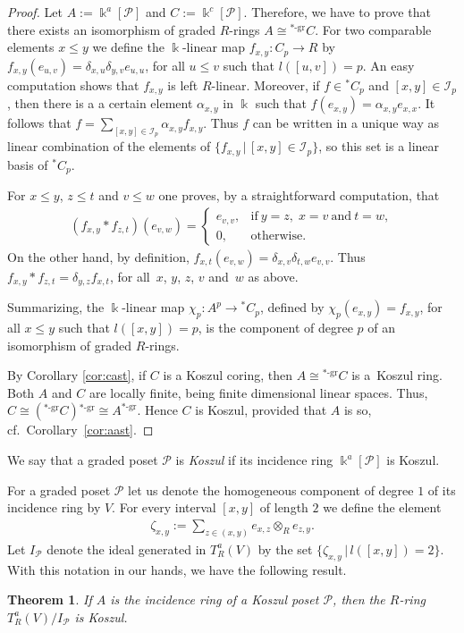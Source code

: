 \documentclass[pdftex]{sigma}
\newcommand\ot{\otimes}
\newcommand\kal{\mathscr}
\renewcommand{\^}[1]{\mbox{$^{\left( #1 \right)}$}}
\renewcommand{\_}[1]{\mbox{$_{\left( #1 \right)}$}}
\newcommand{\al}{\alpha}
\newcommand{\de}{\delta}
\numberwithin{equation}{section}
\newtheorem{Theorem}{Theorem}[section]
\begin{document}
\begin{proof}
Let $A:=\Bbbk^a[\kal{P}]$ and $C:=\Bbbk^c[\kal{P}]$. Therefore, we have to prove that there exists an isomorphism of graded $R$-rings $A\cong {^{*\text{-gr}}}C$. For two comparable elements $x\leq y$ we def\/ine the $\Bbbk$-linear map $f_{x,y}\colon C_p\to R$ by $f_{x,y}(e_{u,v})=\de_{x,u}\de_{y,v}e_{u,u}$, for all $u\leq v$ such that $l([u,v])=p$. An easy computation shows that $f_{x,y}$ is left $R$-linear. Moreover, if $f\in {^*}C_p$ and $[x,y]\in\kal{I}_p$, then there is a a certain element $\al_{x,y}$ in $\Bbbk$ such that $f(e_{x,y})=\al_{x,y}e_{x,x}$. It follows that $f=\sum\limits_{[x,y]\in\kal{I}_p}\al_{x,y}f_{x,y}$. Thus $f$ can be written in a unique way as linear combination of the elements of $\{f_{x,y}\,|\, {[x,y]\in\kal{I}_p}\}$, so this set is a linear basis of ${^*}C_p$.

For $x\leq y$, $z\leq t$ and $v\leq w$ one proves, by a straightforward computation, that
\begin{gather*}
 (f_{x,y}\ast f_{z,t})(e_{v,w})= \begin{cases}
 e_{v,v}, &\text{if} \ y=z,\; x=v \ \text{and} \ t=w,\\
 0,&\text{otherwise}.
 \end{cases}
\end{gather*}
On the other hand, by def\/inition, $f_{x,t}(e_{v,w})=\de_{x,v}\de_{t,w}e_{v,v}$. Thus $f_{x,y}\ast f_{z,t}=\de_{y,z}f_{x,t}$, for all~$x$, $y$, $z$, $v$ and~$w$ as above.

Summarizing, the $\Bbbk$-linear map $\chi_p\colon A^p \to {}^*C_p$, def\/ined by $\chi_p(e_{x,y})=f_{x,y}$, for all $x\leq y$ such that $l([x,y])=p$, is the component of degree $p$ of an isomorphism of graded $R$-rings.

By Corollary \ref{cor:cast}, if $C$ is a Koszul coring, then $A\cong {}^{*\text{-gr}}C$ is a~Koszul ring. Both $A$ and $C$ are locally f\/inite, being f\/inite dimensional linear spaces. Thus, $C\cong {}(^{*\text{-gr}}C){}^{*\text{-gr}}\cong A^{*\text{-gr}}$. Hence $C$ is Koszul, provided that $A$ is so, cf.\ Corollary~\ref{cor:aast}.
\end{proof}
\begin{Definition}
 We say that a graded poset $\kal{P}$ is \textit{Koszul} if its incidence ring $\Bbbk^a[\kal{P} ]$ is Koszul.
\end{Definition}

For a graded poset $\kal{P}$ let us denote the homogeneous component of degree $1$ of its incidence ring by $V$. For every interval $[x,y]$ of length $2$ we def\/ine the element
\begin{gather*}
\zeta_{x,y}:=\sum_{z\in (x,y)}e_{x,z}\ot_R e_{z,y}.
\end{gather*}
Let $I_\kal{P}$ denote the ideal generated in $T^a_R(V)$ by the set $\{\zeta_{x,y}\,|\, l([x,y])=2 \}$. With this notation in our hands, we have the following result.
\begin{Theorem}\label{te:shrieck}
If $A$ is the incidence ring of a Koszul poset $\kal{P}$, then the $R$-ring $T_R^a(V)/I_\kal{P}$ is Koszul.
\end{Theorem}
\end{document}
